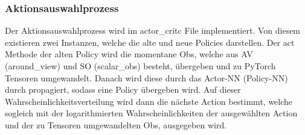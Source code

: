 \subsubsection{Aktionsauswahlprozess}
Der Aktionsauswahlprozess wird im actor\_critc File implementiert. Von diesem existieren zwei Instanzen, welche die alte und neue Policies darstellen. Der act Methode der alten Policy wird die momentane Obs, welche aus AV (around\_view) und SO (scalar\_obs) besteht, übergeben und zu PyTorch Tensoren umgewandelt. Danach wird diese durch das Actor-NN (Policy-NN) durch propagiert, sodass eine Policy übergeben wird. Auf dieser Wahrscheinlichkeitsverteilung wird dann die nächste Action bestimmt, welche sogleich mit der logarithmierten Wahrscheinlichkeiten der ausgewählten Action und der zu Tensoren umgewandelten Obs, ausgegeben wird.

